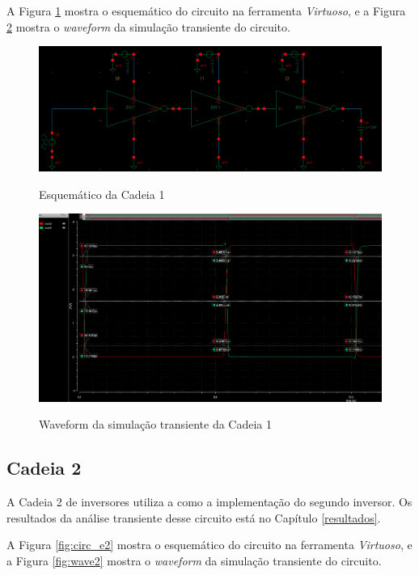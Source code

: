 \documentclass{iiufrgs}
\newcommand{\virtuoso}{\textit{Virtuoso}}
\begin{document}
A Figura \ref{fig:circ_e1} mostra o esquemático do circuito na ferramenta \virtuoso, e a Figura \ref{fig:wave1} mostra o \textit{waveform} da simulação transiente do circuito.\

\begin{figure}[htbp]
    \centering
    \caption{Esquemático da Cadeia 1}
    \includegraphics[scale=0.33]{images/circ1.png}
    \label{fig:circ_e1}
\end{figure}

\begin{figure}[htbp]
    \centering
    \caption{Waveform da simulação transiente da Cadeia 1}
    \includegraphics[scale=0.4]{images/wave_ex1.png}
    \label{fig:wave1}
\end{figure}

\FloatBarrier

\subsection{Cadeia 2}
A Cadeia 2 de inversores utiliza a  como a implementação do segundo inversor. Os resultados da análise transiente desse circuito está no Capítulo \ref{resultados}.\

A Figura \ref{fig:circ_e2} mostra o esquemático do circuito na ferramenta \virtuoso, e a Figura \ref{fig:wave2} mostra o \textit{waveform} da simulação transiente do circuito.\
\end{document}
